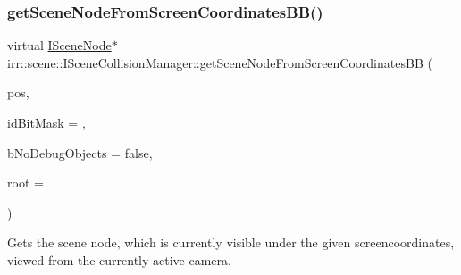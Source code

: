 \subsubsection{\texorpdfstring{get\+Scene\+Node\+From\+Screen\+Coordinates\+B\+B()}{getSceneNodeFromScreenCoordinatesBB()}\hspace{0.1cm}{\footnotesize\ttfamily [2/2]}}
{\footnotesize\ttfamily virtual \hyperlink{classirr_1_1scene_1_1ISceneNode}{I\+Scene\+Node}$\ast$ irr\+::scene\+::\+I\+Scene\+Collision\+Manager\+::get\+Scene\+Node\+From\+Screen\+Coordinates\+BB (\begin{DoxyParamCaption}\item[{const core\+::position2d$<$ \hyperlink{namespaceirr_ac66849b7a6ed16e30ebede579f9b47c6}{s32} $>$ \&}]{pos,  }\item[{\hyperlink{namespaceirr_ac66849b7a6ed16e30ebede579f9b47c6}{s32}}]{id\+Bit\+Mask = {},  }\item[{bool}]{b\+No\+Debug\+Objects = {\ttfamily false},  }\item[{\hyperlink{classirr_1_1scene_1_1ISceneNode}{I\+Scene\+Node} $\ast$}]{root = {} }\end{DoxyParamCaption})\hspace{0.3cm}{\ttfamily [pure virtual]}}



Gets the scene node, which is currently visible under the given screencoordinates, viewed from the currently active camera. 

